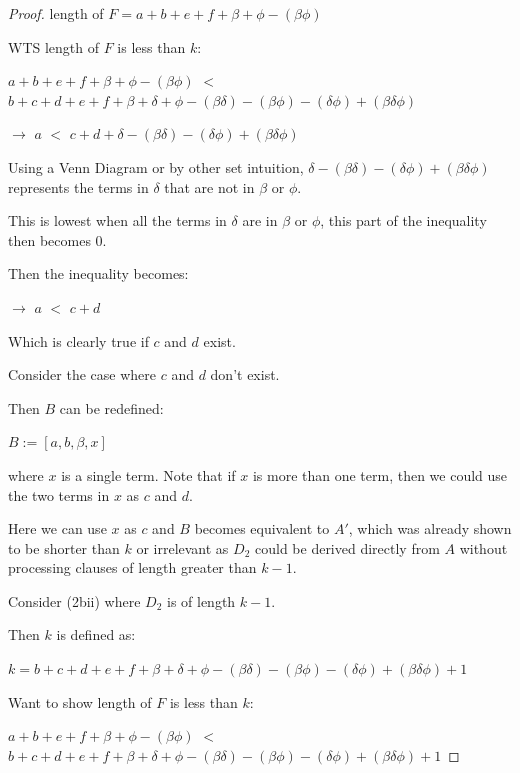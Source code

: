 \documentclass[manuscript]{acmart}
\begin{document}
\begin{proof}
        length of $F = a + b + e + f + \beta + \phi - (\beta \phi)$
        
        WTS length of $F$ is less than $k$:

        $a + b + e + f + \beta + \phi - (\beta \phi)$ $<$ 
        $b + c + d + e + f + \beta + \delta + \phi - (\beta \delta) 
        - (\beta \phi) - (\delta \phi) + (\beta \delta \phi)$

        $\rightarrow$ $a$ $<$ $c + d + \delta - (\beta \delta) - 
        (\delta \phi) + (\beta \delta \phi)$

        Using a Venn Diagram or by other set intuition, 
        $\delta - (\beta \delta) - (\delta \phi) + (\beta \delta \phi)$
        represents the terms in $\delta$ that are not in $\beta$ or $\phi$.
        
        This is lowest when all the terms in $\delta$ are in $\beta$ or $\phi$, 
        this part of the inequality then becomes 0.

        Then the inequality becomes:

        $\rightarrow$ $a$ $<$ $c + d$

        Which is clearly true if $c$ and $d$ exist.

        Consider the case where $c$ and $d$ don't exist.

        Then $B$ can be redefined:

        $B := [a, b, \beta, x]$

        where $x$ is a single term. Note that if $x$ is more than one term,
        then we could use the two terms in $x$ as $c$ and $d$.

        Here we can use $x$ as $c$ and $B$ becomes equivalent to $A'$, 
        which was already shown to be shorter than $k$ or irrelevant
        as $D_2$ could be derived directly from $A$ without processing
        clauses of length greater than $k-1$.

        Consider (2bii) where $D_2$ is of length $k - 1$.

        Then $k$ is defined as:

        $k = b + c + d + e + f + \beta + \delta + \phi - (\beta \delta) 
        - (\beta \phi) - (\delta \phi) + (\beta \delta \phi) + 1$

        Want to show length of $F$ is less than $k$:

        $a + b + e + f + \beta + \phi - (\beta \phi)$ $<$ 
        $b + c + d + e + f + \beta + \delta + \phi - (\beta \delta) 
        - (\beta \phi) - (\delta \phi) + (\beta \delta \phi) + 1$


\end{proof}
\end{document}
